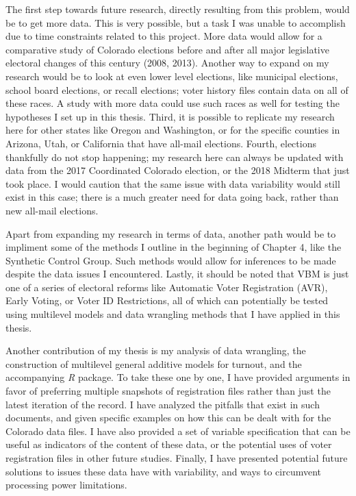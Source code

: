 \documentclass[]{article}
\begin{document}
The first step towards future research, directly resulting from this
problem, would be to get more data. This is very possible, but a task I
was unable to accomplish due to time constraints related to this
project. More data would allow for a comparative study of Colorado
elections before and after all major legislative electoral changes of
this century (2008, 2013). Another way to expand on my research would be
to look at even lower level elections, like municipal elections, school
board elections, or recall elections; voter history files contain data
on all of these races. A study with more data could use such races as
well for testing the hypotheses I set up in this thesis. Third, it is
possible to replicate my research here for other states like Oregon and
Washington, or for the specific counties in Arizona, Utah, or California
that have all-mail elections. Fourth, elections thankfully do not stop
happening; my research here can always be updated with data from the
2017 Coordinated Colorado election, or the 2018 Midterm that just took
place. I would caution that the same issue with data variability would
still exist in this case; there is a much greater need for data going
back, rather than new all-mail elections.

Apart from expanding my research in terms of data, another path would be
to impliment some of the methods I outline in the beginning of Chapter
4, like the Synthetic Control Group. Such methods would allow for
inferences to be made despite the data issues I encountered. Lastly, it
should be noted that VBM is just one of a series of electoral reforms
like Automatic Voter Registration (AVR), Early Voting, or Voter ID
Restrictions, all of which can potentially be tested using multilevel
models and data wrangling methods that I have applied in this thesis.

Another contribution of my thesis is my analysis of data wrangling, the
construction of multilevel general additive models for turnout, and the
accompanying \textit{R} package. To take these one by one, I have
provided arguments in favor of preferring multiple snapshots of
registration files rather than just the latest iteration of the record.
I have analyzed the pitfalls that exist in such documents, and given
specific examples on how this can be dealt with for the Colorado data
files. I have also provided a set of variable specification that can be
useful as indicators of the content of these data, or the potential uses
of voter registration files in other future studies. Finally, I have
presented potential future solutions to issues these data have with
variability, and ways to circumvent processing power limitations.
\end{document}
